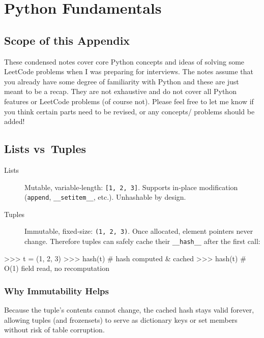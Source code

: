 
\chapter{Python Fundamentals}

\section{Scope of this Appendix}
These condensed notes cover core Python concepts and ideas of solving some LeetCode problems when 
I was preparing for interviews.  The notes assume that you already have some degree of familiarity
with Python and these are just meant to be a recap. They are not exhaustive and do not cover all Python features or
LeetCode problems (of course not). Please feel free to let me know if you think certain parts need
to be revised, or any concepts/ problems should be added!

\section{Lists vs\ Tuples}
\begin{description}
  \item[Lists] Mutable, variable‑length: \verb|[1, 2, 3]|.  Supports in‑place modification (\verb|append|, \verb|__setitem__|, etc.).  Unhashable by design.
  \item[Tuples] Immutable, fixed‑size: \verb|(1, 2, 3)|.  Once allocated, element pointers never change.  Therefore tuples can safely cache their \verb|__hash__| after the first call:
\end{description}
\begin{python}
>>> t = (1, 2, 3)
>>> hash(t)         # hash computed & cached
>>> hash(t)         # O(1) field read, no recomputation
\end{python}

\subsection*{Why Immutability Helps}
Because the tuple’s contents cannot change, the cached hash stays valid forever, allowing tuples (and frozensets) to serve as dictionary keys or set members without risk of table corruption.

